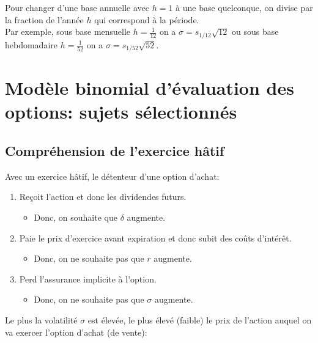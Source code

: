 \documentclass[10pt, french]{article}
\begin{document}
\begin{multicols*}{2}
Pour changer d'une base annuelle avec $h	=	1$ à une base quelconque, on divise par la fraction de l'année $h$ qui correspond à la période. \\

Par exemple, sous base mensuelle $h = \frac{1}{12}$ on a $\sigma = s_{1/12}\sqrt{12}$ ou sous base hebdomadaire $h = \frac{1}{52}$ on a $\sigma = s_{1/52}\sqrt{52}$. 



\newpage
\section{Modèle binomial d’évaluation des options: sujets sélectionnés}

\subsection{Compréhension de l'exercice hâtif}

Avec un exercice hâtif, le détenteur d'une option {\color{amethyst}d'achat}:
\begin{enumerate}[leftmargin = *]
	\item	Reçoit l'action et donc les dividendes futurs.
		\begin{itemize}
		\item	Donc, on souhaite que $\delta$ \textcolor{amethyst}{augmente}.
		\end{itemize}
	\item	Paie le prix d'exercice avant expiration et donc subit des coûts d'intérêt.
		\begin{itemize}
		\item	Donc, on ne souhaite pas que $r$ \textcolor{amethyst}{augmente}.
		\end{itemize}
	\item	Perd l'assurance implicite à l'option.
		\begin{itemize}
		\item	Donc, on ne souhaite pas que $\sigma$ \textcolor{amethyst}{augmente}.
		\end{itemize}
\end{enumerate}

Le plus la volatilité $\sigma$ est élevée, le plus {\color{amethyst}élevé} {\color{burntsienna}(faible)} le prix de l'action auquel on va exercer l'option {\color{amethyst}d'achat} {\color{burntsienna}(de vente)}:
\begin{center}




\end{center}
\end{multicols*}
\end{document}
